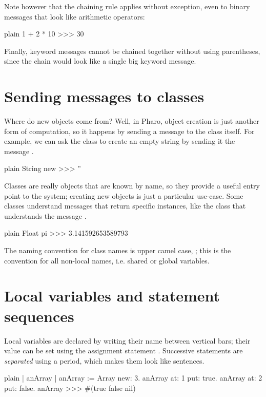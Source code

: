 \documentclass[10pt,twoside,english]{_support/latex/sbabook/sbabook}
\begin{document}
Note however that the chaining rule applies without exception, even to binary messages that look like arithmetic operators:

\begin{displaycode}{plain}
1 + 2 * 10
>>> 30
\end{displaycode}

Finally, keyword messages cannot be chained together without using parentheses, since the chain would look like a single big keyword message.
\section{Sending messages to classes}
Where do new objects come from?
Well, in Pharo, object creation is just another form of computation, so it happens by sending a message to the class itself.
For example, we can ask the class  to create an empty string by sending it the message .

\begin{displaycode}{plain}
String new
>>> ''
\end{displaycode}

Classes are really objects that are known by name, so they provide a useful entry point to the system; creating new objects is just a particular use-case.
Some classes understand messages that return specific instances, like the class  that understands the message .

\begin{displaycode}{plain}
Float pi
>>> 3.141592653589793
\end{displaycode}

\begin{coffee}
The naming convention for class names is upper camel case, ; this is the convention for all non-local names, i.e. shared or global variables.
\end{coffee}
\section{Local variables and statement sequences}
Local variables are declared by writing their name between vertical bars; their value can be set using the assignment statement \textcode{:=}.
Successive statements are \textit{separated} using a period, which makes them look like sentences.

\begin{displaycode}{plain}
| anArray |
anArray := Array new: 3.
anArray at: 1 put: true.
anArray at: 2 put: false.
anArray
>>> #(true false nil)
\end{displaycode}
\end{document}
